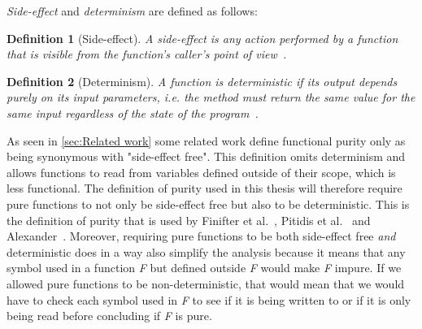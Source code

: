 \documentclass[a4paper,12pt]{article}
\newtheorem{definition}{Definition} %
\begin{document}
\textit{Side-effect} and \textit{determinism} are defined as follows:

\begin{definition}[Side-effect] \label{def:side-effect}
  A side-effect is any action performed by a function that is visible from the function's caller's point of view~\cite{purity-in-javascript}.
\end{definition}

\begin{definition}[Determinism] \label{def:determinism}
  A function is deterministic if its output depends purely on its input parameters, i.e. the method must return the same value for the same input regardless of the state of the program~\cite{purity-in-java}.
\end{definition}

As seen in \autoref{sec:Related work} some related work define functional purity only as being synonymous with "side-effect free". This definition omits determinism and allows functions to read from variables defined outside of their scope, which is less functional. The definition of purity used in this thesis will therefore require pure functions to not only be side-effect free but also to be deterministic. This is the definition of purity that is used by Finifter et al.~\cite{purity-in-java}, Pitidis et al.~\cite{pitidis2010purity} and Alexander~\cite{alvin-alexander}. %
Moreover, requiring pure functions to be both side-effect free \textit{and} deterministic does in a way also simplify the analysis because it means that any symbol used in a function \textit{F} but defined outside \textit{F} would make \textit{F} impure. If we allowed pure functions to be non-deterministic, that would mean that we would have to check each symbol used in \textit{F} to see if it is being written to or if it is only being read before concluding if \textit{F} is pure.


\end{document}
